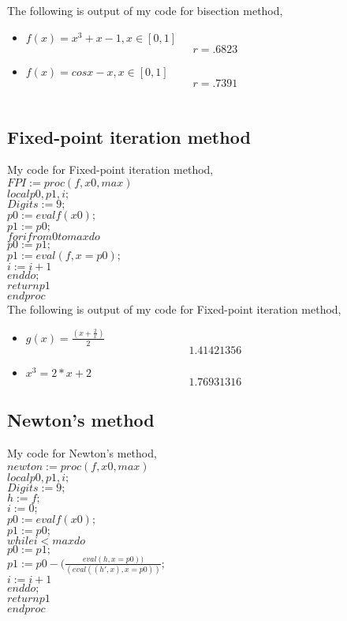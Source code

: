 \documentclass[12pt]{article}
\begin{document}
The following is output of my code for bisection method,
\begin{itemize}
\item $f(x) = x^3+x-1, x \in [0,1]$
$$r = .6823$$
\item $f(x) = cosx - x, x \in [0,1]$
$$r = .7391$$\\
\end{itemize}
\subsection{Fixed-point iteration method}
My code for Fixed-point iteration method,\\

$FPI := proc (f, x0, max)$\\
$local p0, p1, i;$\\
$Digits := 9;$\\
$p0 := evalf(x0);$\\
$p1 := p0;$\\
$for i from 0 to max do$\\
$p0 := p1;$\\
$p1 := eval(f, x = p0);$\\
$i := i+1$\\
$end do;$\\
$return p1$\\
$end proc$\\

The following is output of my code for Fixed-point iteration method,
\begin{itemize}
\item $g(x) = \frac{(x+\frac{2}{x})}{2}$
$$1.41421356$$
\item $x^3 = 2*x+2$
$$1.76931316$$
\end{itemize}
\clearpage
\subsection{Newton's method}
My code for Newton's method,\\

$newton := proc (f, x0, max)$\\
$local p0, p1, i;$\\
$Digits := 9;$\\
$h := f;$\\
$i := 0;$\\
$p0 := evalf(x0);$\\
$p1 := p0;$\\
$while i < max do$\\
$p0 := p1;$\\
$p1 := p0-(\frac{eval(h, x = p0))}{(eval((h', x), x = p0))};$\\
$i := i+1$\\
$end do;$\\
$return p1$\\
$end proc$\\
\end{document}
